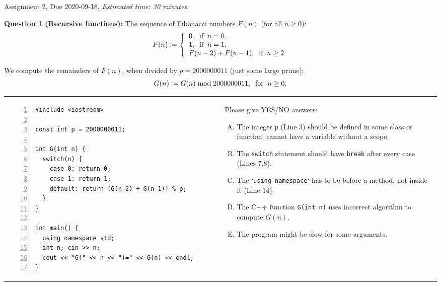 \documentclass[11pt]{article}
\begin{document}
\thispagestyle{empty}



\begin{center}
{\Large Assignment 2, Due 2020-09-18},
{\em Estimated time: 30 minutes}
\end{center}

\vspace{10pt}
{\bf Question 1 (Recursive functions):} The sequence of Fibonacci numbers $F(n)$ (for all $n \geq 0$): 
$$F(n) \vcentcolon= \left\{ \begin{array}{l}
0,\;\;\mbox{if}\;\;n = 0,\\
1,\;\;\mbox{if}\;\;n = 1,\\
F(n-2)+F(n-1),\;\;\mbox{if}\;\;n \geq 2\\
\end{array} \right.$$

We compute the remainders of $F(n)$, when 
divided by $p = 2000000011$ (just some large prime):
\begin{equation}
\label{function-g}
G(n) \vcentcolon= G(n) \bmod 2000000011,\;\;\mbox{for}\;\;n \geq 0.
\end{equation}



\begin{tabular}{@{}ll@{}} 
\begin{minipage}{0.48\columnwidth}
{\footnotesize
\begin{Verbatim}[frame=single,numbers=left]
#include <iostream>

const int p = 2000000011;

int G(int n) { 
  switch(n) {
    case 0: return 0; 
    case 1: return 1;
    default: return (G(n-2) + G(n-1)) % p;
  }
}

int main() {
  using namespace std;
  int n; cin >> n;
  cout << "G(" << n << ")=" << G(n) << endl;
}
\end{Verbatim}
}
\end{minipage} &
\begin{minipage}{0.5\columnwidth}

Please give YES/NO answers:

\begin{enumerate}[(A)]
\item The integer {\tt p} (Line 3) should be defined in some class or function; cannot have a variable without a scope.
\item The {\tt switch} statement should have {\tt break} after every case (Lines 7,8).
\item The `{\tt using namespace}` has to be before a method, not inside it (Line 14).
\item The C++ function {\tt G(int n)} uses incorrect algorithm to compute $G(n)$.
\item The program might be slow for some arguments.
\end{enumerate}

\end{minipage}
\end{tabular}
\end{document}
